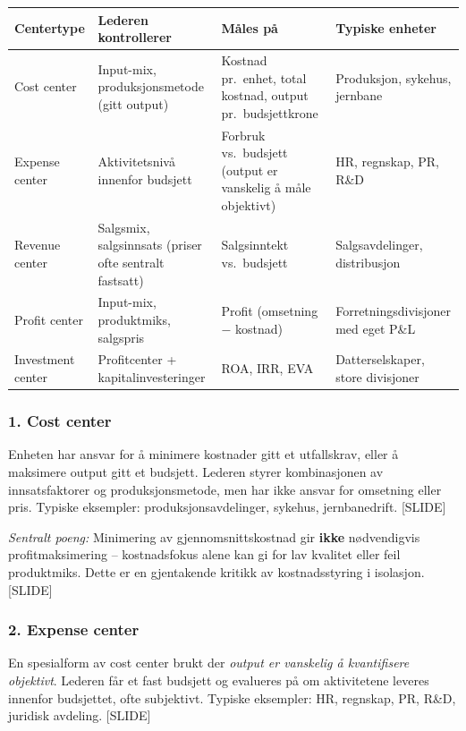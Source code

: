 \begin{center}
\begin{tabular}{@{}p{2.6cm}p{4.0cm}p{4.0cm}p{3.0cm}@{}}
\toprule
\textbf{Centertype} & \textbf{Lederen kontrollerer} & \textbf{Måles på} & \textbf{Typiske enheter} \\
\midrule
Cost center & Input-mix, produksjonsmetode (gitt output) & Kostnad pr.\ enhet, total kostnad, output pr.\ budsjettkrone & Produksjon, sykehus, jernbane \\
Expense center & Aktivitetsnivå innenfor budsjett & Forbruk vs.\ budsjett (output er vanskelig å måle objektivt) & HR, regnskap, PR, R\&D \\
Revenue center & Salgsmix, salgsinnsats (priser ofte sentralt fastsatt) & Salgsinntekt vs.\ budsjett & Salgsavdelinger, distribusjon \\
Profit center & Input-mix, produktmiks, salgspris & Profit (omsetning $-$ kostnad) & Forretningsdivisjoner med eget P\&L \\
Investment center & Profitcenter + kapitalinvesteringer & ROA, IRR, EVA & Datterselskaper, store divisjoner \\
\bottomrule
\end{tabular}
\end{center}

\subsubsection*{1. Cost center}
Enheten har ansvar for å minimere kostnader gitt et utfallskrav, eller å maksimere output gitt et budsjett. Lederen styrer kombinasjonen av innsatsfaktorer og produksjonsmetode, men har ikke ansvar for omsetning eller pris. Typiske eksempler: produksjonsavdelinger, sykehus, jernbanedrift. [SLIDE]

\emph{Sentralt poeng:} Minimering av gjennomsnittskostnad gir \textbf{ikke} nødvendigvis profitmaksimering -- kostnadsfokus alene kan gi for lav kvalitet eller feil produktmiks. Dette er en gjentakende kritikk av kostnadsstyring i isolasjon. [SLIDE]

\subsubsection*{2. Expense center}
En spesialform av cost center brukt der \emph{output er vanskelig å kvantifisere objektivt}. Lederen får et fast budsjett og evalueres på om aktivitetene leveres innenfor budsjettet, ofte subjektivt. Typiske eksempler: HR, regnskap, PR, R\&D, juridisk avdeling. [SLIDE]

